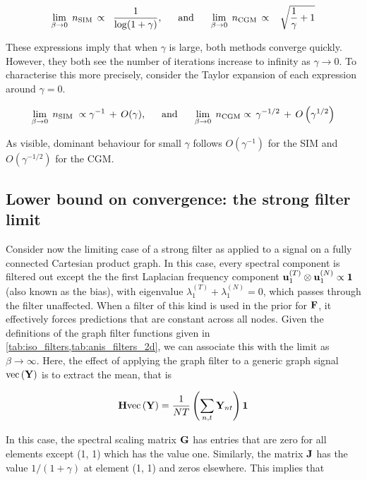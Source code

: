  \begin{equation}
    \label{eq:n_WFL}
    \lim_{\beta \rightarrow 0} \;  n_\text{SIM} \, \propto \;\;  \frac{1}{\log(1 + \gamma)}, \;\;  \quad \text{and} \quad  \;\; \lim_{\beta \rightarrow 0} \;  n_\text{CGM} \, \propto \;\;\;  \sqrt{\frac{1}{\gamma} + 1}
 \end{equation}

These expressions imply that when $\gamma$ is large, both methods converge quickly. However, they both see the number of iterations increase to infinity as $\gamma \rightarrow 0$. To characterise this more precisely, consider the Taylor expansion of each expression around $\gamma = 0$.  

\begin{equation}
    \lim_{\beta \rightarrow 0} \;  n_\text{SIM}  \;  \propto \gamma^{-1} \, + \, O(\gamma), \;\; \quad \text{and} \quad \;\; \lim_{\beta \rightarrow 0} \;  n_\text{CGM} \propto \, \gamma^{-1/2} \, + \, O\left(\gamma^{1/2}\right) 
\end{equation}


As visible, dominant behaviour for small $\gamma$ follows $O(\gamma^{-1})$ for the SIM and $O(\gamma^{-1/2})$ for the CGM.

\subsection{Lower bound on convergence: the strong filter limit}

Consider now the limiting case of a strong filter as applied to a signal on a fully connected Cartesian product graph. In this case, every spectral component is filtered out except the the first Laplacian frequency component $\mathbf{u}_1^{(T)} \otimes \mathbf{u}_1^{(N)}   \propto \mathbf{1}$ (also known as the bias), with eigenvalue $\lambda_1^{(T)} + \lambda_1^{(N)} = 0$, which passes through the filter unaffected. When a filter of this kind is used in the prior for $\mathbf{F}$, it effectively forces predictions that are constant across all nodes. Given the definitions of the graph filter functions given in \cref{tab:iso_filters,tab:anis_filters_2d}, we can associate this with the limit as $\beta \rightarrow \infty$. Here, the effect of applying the graph filter to a generic graph signal $\text{\textup{vec}}\left(\mathbf{Y}\right)$ is to extract the mean, that is 

$$
\mathbf{H} \text{\textup{vec}}\left(\mathbf{Y}\right) = \frac{1}{NT} \left(\sum_{n, t} \mathbf{Y}_{nt}\right) \mathbf{1}
$$


In this case, the spectral scaling matrix $\mathbf{G}$ has entries that are zero for all elements except (1, 1) which has the value one. Similarly, the matrix $\mathbf{J}$ has the value $1 / (1 + \gamma)$ at element (1, 1) and zeros elsewhere. This implies that


